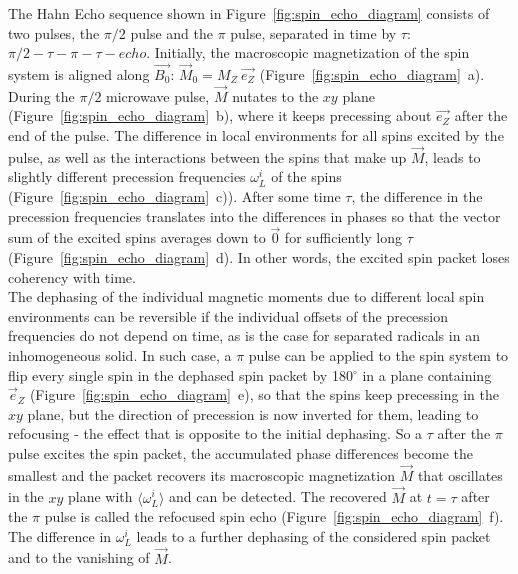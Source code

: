 The Hahn Echo sequence shown in Figure~\ref{fig:spin_echo_diagram} consists of two pulses, the $\pi/2$ pulse and the $\pi$ pulse, separated in time by $\tau$: $\pi/2 - \tau - \pi - \tau - echo$. Initially, the macroscopic magnetization of the spin system is aligned along $\vec{B_0}$: $\vec{M}_0=M_Z~\vec{e_Z}$ (Figure~\ref{fig:spin_echo_diagram}~a). During the $\pi/2$ microwave pulse, $\vec{M}$ nutates to the $xy$ plane (Figure~\ref{fig:spin_echo_diagram}~b), where it keeps precessing about $\vec{e_Z}$ after the end of the pulse. The difference in local environments for all spins excited by the pulse, as well as the interactions between the spins that make up $\vec{M}$, leads to slightly different precession frequencies $\omega_L^i$ of the spins (Figure~\ref{fig:spin_echo_diagram}~c)). After some time $\tau$, the difference in the precession frequencies translates into the differences in phases so that the vector sum of the excited spins averages down to $\vec{0}$ for sufficiently long $\tau$ (Figure~\ref{fig:spin_echo_diagram}~d). In other words, the excited spin packet loses coherency with time.\\ 
The dephasing of the individual magnetic moments due to different local spin environments can be reversible if the individual offsets of the precession frequencies do not depend on time, as is the case for separated radicals in an inhomogeneous solid. In such case, a $\pi$ pulse can be applied to the spin system to flip every single spin in the dephased spin packet by 180$^{\circ}$ in a plane containing $\vec{e}_Z$ (Figure~\ref{fig:spin_echo_diagram}~e), so that the spins keep precessing in the $xy$ plane, but the direction of precession is now inverted for them, leading to refocusing - the effect that is opposite to the initial dephasing. So a $\tau$ after the $\pi$ pulse excites the spin packet, the accumulated phase differences become the smallest and the packet recovers its macroscopic magnetization $\vec{M}$ that oscillates in the $xy$ plane with $\langle\omega_L^i\rangle$ and can be detected. The recovered $\vec{M}$ at $t=\tau$ after the $\pi$ pulse is called the refocused spin echo (Figure~\ref{fig:spin_echo_diagram}~f). The difference in $\omega_L^i$ leads to a further dephasing of the considered spin packet and to the vanishing of $\vec{M}$.\\


